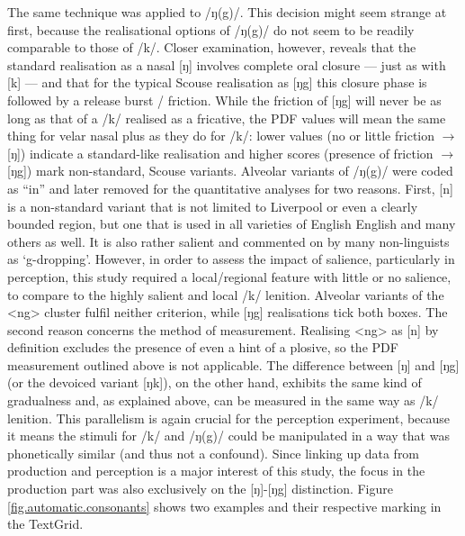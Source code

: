 The same technique was applied to /ŋ(g)/.
This decision might seem strange at first, because the realisational options of /ŋ(g)/ do not seem to be readily comparable to those of /k/.
Closer examination, however, reveals that the standard realisation as a nasal [ŋ] involves complete oral closure --- just as with [k] --- and that for the typical Scouse realisation as [ŋg] this closure phase is followed by a release burst / friction.
While the friction of [ŋg] will never be as long as that of a /k/ realised as a fricative, the PDF values will mean the same thing for velar nasal plus as they do for /k/: lower values (no or little friction \(\rightarrow\) [ŋ]) indicate a standard-like realisation and higher scores (presence of friction \(\rightarrow\) [ŋg]) mark non-standard, Scouse variants.
Alveolar variants of /ŋ(g)/ were coded as ``in'' and later removed for the quantitative analyses for two reasons.
First, [n] is a non-standard variant that is not limited to Liverpool or even a clearly bounded region, but one that is used in all varieties of English English and many others as well.
It is also rather salient and commented on by many non-linguists as \enquote*{g-dropping}.
However, in order to assess the impact of salience, particularly in perception, this study required a local/regional feature with little or no salience, to compare to the highly salient and local /k/ lenition.
Alveolar variants of the <ng> cluster fulfil neither criterion, while [ŋg] realisations tick both boxes.
The second reason concerns the method of measurement.
Realising <ng> as [n] by definition excludes the presence of even a hint of a plosive, so the PDF measurement outlined above is not applicable.
The difference between [ŋ] and [ŋg] (or the devoiced variant [ŋk]), on the other hand, exhibits the same kind of gradualness and, as explained above, can be measured in the same way as /k/ lenition.
This parallelism is again crucial for the perception experiment, because it means the stimuli for /k/ and /ŋ(g)/ could be manipulated in a way that was phonetically similar (and thus not a confound).
Since linking up data from production and perception is a major interest of this study, the focus in the production part was also exclusively on the [ŋ]-[ŋg] distinction.
Figure \ref{fig.automatic.consonants} shows two examples and their respective marking in the TextGrid.

